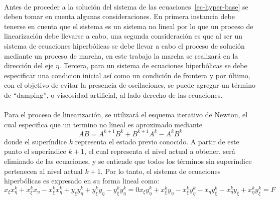 \documentclass[letterpaper, openright, 12pt]{book}
\begin{document}
    \paragraph*{}
    Antes de proceder a la solución del sistema de las
    ecuaciones~\ref{ec-hyper-base} se deben tomar en cuenta algunas
    consideraciones. En primera instancia debe tenerse en cuenta que el sistema
    es un sistema no lineal por lo que un proceso de linearización debe llevarse
    a cabo, una segunda consideración es que al ser un sistema de ecuaciones
    hiperbólicas se debe llevar a cabo el proceso de solución mediante un
    proceso de marcha, en este trabajo la marcha se realizará en la
    dirección del eje $\eta$. Tercera, para un sistema de ecuaciones
    hiperbólicas se debe especificar una condicion inicial así como un
    condición de frontera y por último, con el objetivo de evitar la
    presencia de oscilaciones, se puede agregar un término de ``damping'', o
    viscosidad artificial, al lado derecho de las ecuaciones.

    \paragraph*{}
    Para el proceso de linearización, se utilizará el esquema iterativo de
    Newton, el cual especifica que un termino no lineal es aproximado
    mediante
    \begin{equation}
        AB = A^{k + 1} B^{k} + B^{k + 1} A^{k} - A^{k} B^{k}
    \end{equation}
    donde el superíndice $k$ representa el estado previo conocido. A partir
    de este punto el superíndice $k + 1$, el cual representa el nivel actual
    a obtener, será eliminado de las ecuaciones, y se entiende que todos los
    términos sin superíndice pertenecen al nivel actual $k + 1$. Por lo
    tanto, el sistema de ecuaciones hiperbólicas es expresado en su forma
    lineal como:
    \begin{subequations}
        \begin{equation}
            x_{\xi} x_{\eta}^{k} + x_{\xi}^{k} x_{\eta}
            - x_{\xi}^{k} x_{\eta}^{k} + y_{\xi} y_{\eta}^{k}
            + y_{\xi}^{k} y_{\eta} - y_{\xi}^{k} y_{\eta}^{k} = 0
        \end{equation}
        \begin{equation}
            x_{\xi} y_{\eta}^{k} + x_{\xi}^{k} y_{\eta}
            - x_{\xi}^{k} y_{\eta}^{k} - x_{\eta} y_{\xi}^{k}
            - x_{\eta}^{k} y_{\xi} + x_{\eta}^{k} y_{\xi}^{k} = F
        \end{equation}
        \label{ec-hyper-linear}
    \end{subequations}
\end{document}
